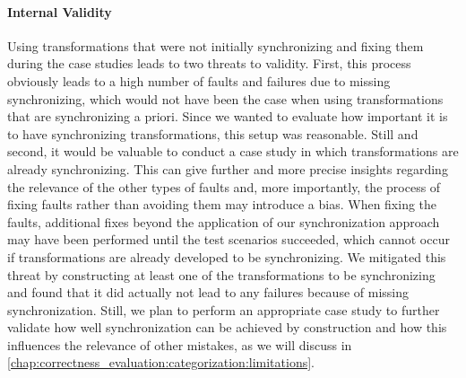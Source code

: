 \paragraph{Internal Validity}

Using transformations that were not initially synchronizing and fixing them during the case studies leads to two threats to validity. 
First, this process obviously leads to a high number of faults and failures due to missing synchronizing, which would not have been the case when using transformations that are synchronizing a priori.
Since we wanted to evaluate how important it is to have synchronizing transformations, this setup was reasonable.
Still and second, it would be valuable to conduct a case study in which transformations are already synchronizing.
This can give further and more precise insights regarding the relevance of the other types of faults and, more importantly, the process of fixing faults rather than avoiding them may introduce a bias.
When fixing the faults, additional fixes beyond the application of our synchronization approach may have been performed until the test scenarios succeeded, which cannot occur if transformations are already developed to be synchronizing.
We mitigated this threat by constructing at least one of the transformations to be synchronizing and found that it did actually not lead to any failures because of missing synchronization.
Still, we plan to perform an appropriate case study to further validate how well synchronization can be achieved by construction and how this influences the relevance of other mistakes, as we will discuss in \autoref{chap:correctness_evaluation:categorization:limitations}.

